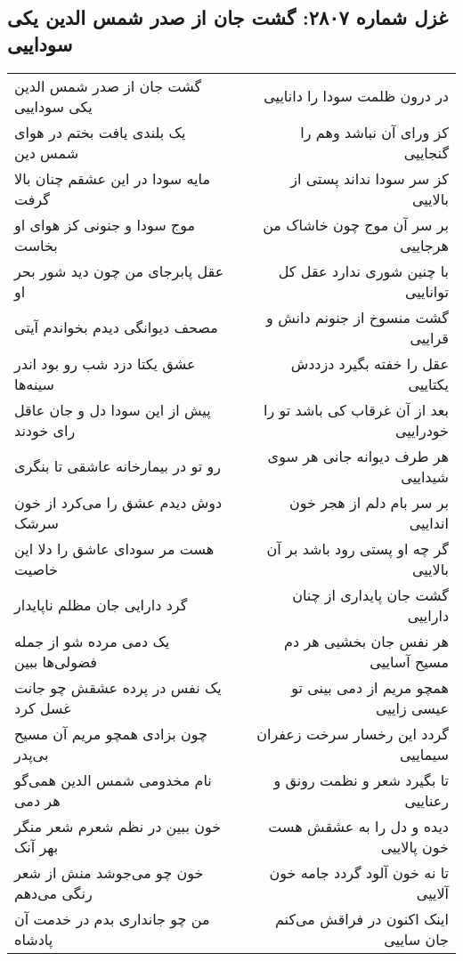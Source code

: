 \begin{center}
\section*{غزل شماره ۲۸۰۷: گشت جان از صدر شمس الدین یکی سوداییی}
\label{sec:2807}
\begin{longtable}{l p{0.5cm} r}
گشت جان از صدر شمس الدین یکی سوداییی
&&
در درون ظلمت سودا را داناییی
\\
یک بلندی یافت بختم در هوای شمس دین
&&
کز ورای آن نباشد وهم را گنجاییی
\\
مایه سودا در این عشقم چنان بالا گرفت
&&
کز سر سودا نداند پستی از بالاییی
\\
موج سودا و جنونی کز هوای او بخاست
&&
بر سر آن موج چون خاشاک من هرجاییی
\\
عقل پابرجای من چون دید شور بحر او
&&
با چنین شوری ندارد عقل کل تواناییی
\\
مصحف دیوانگی دیدم بخواندم آیتی
&&
گشت منسوخ از جنونم دانش و قراییی
\\
عشق یکتا دزد شب رو بود اندر سینه‌ها
&&
عقل را خفته بگیرد دزددش یکتاییی
\\
پیش از این سودا دل و جان عاقل رای خودند
&&
بعد از آن غرقاب کی باشد تو را خودراییی
\\
رو تو در بیمارخانه عاشقی تا بنگری
&&
هر طرف دیوانه جانی هر سوی شیداییی
\\
دوش دیدم عشق را می‌کرد از خون سرشک
&&
بر سر بام دلم از هجر خون انداییی
\\
هست مر سودای عاشق را دلا این خاصیت
&&
گر چه او پستی رود باشد بر آن بالاییی
\\
گرد دارایی جان مظلم ناپایدار
&&
گشت جان پایداری از چنان داراییی
\\
یک دمی مرده شو از جمله فضولی‌ها ببین
&&
هر نفس جان بخشیی هر دم مسیح آساییی
\\
یک نفس در پرده عشقش چو جانت غسل کرد
&&
همچو مریم از دمی بینی تو عیسی زاییی
\\
چون بزادی همچو مریم آن مسیح بی‌پدر
&&
گردد این رخسار سرخت زعفران سیماییی
\\
نام مخدومی شمس الدین همی‌گو هر دمی
&&
تا بگیرد شعر و نظمت رونق و رعناییی
\\
خون ببین در نظم شعرم شعر منگر بهر آنک
&&
دیده و دل را به عشقش هست خون پالاییی
\\
خون چو می‌جوشد منش از شعر رنگی می‌دهم
&&
تا نه خون آلود گردد جامه خون آلاییی
\\
من چو جانداری بدم در خدمت آن پادشاه
&&
اینک اکنون در فراقش می‌کنم جان ساییی
\\

\end{longtable}
\end{center}
